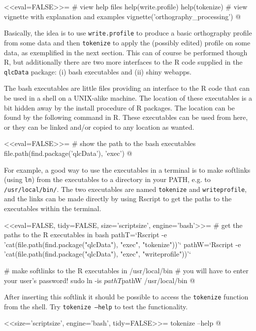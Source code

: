 <<eval=FALSE>>=
# view help files
help(write.profile)
help(tokenize)
# view vignette with explanation and examples
vignette('orthography_processing')
@

Basically, the idea is to use \texttt{write.profile} to produce a
basic orthography profile from some data and then \texttt{tokenize} to apply the
(possibly edited) profile on some data, as exemplified in the next section. This
can of course be performed though R, but additionally there are two more
interfaces to the R code supplied in the \texttt{qlcData} package: (i) bash
executables and (ii) shiny webapps.

The bash executables are little files providing an interface to the R code that
can be used in a shell on a UNIX-alike machine. The location of these
executables is a bit hidden away by the install procedure of R packages. The
location can be found by the following command in R. These executables can be 
used from here, or they can be linked and/or copied to any location as wanted.

<<eval=FALSE>>=
# show the path to the bash executables
file.path(find.package('qlcData'), 'exec')
@

For example, a good way to use the executables in a terminal is to
make softlinks (using \texttt{ln}) from the executables to a directory in your
PATH, e.g. to \texttt{/usr/local/bin/}. The two executables are named
\texttt{tokenize} and \texttt{writeprofile}, and the links can be made directly 
by using Rscript to get the paths to the executables within the terminal.

<<eval=FALSE, tidy=FALSE, size='scriptsize', engine='bash'>>=
# get the paths to the R executables in bash
pathT=`Rscript -e 'cat(file.path(find.package("qlcData"), "exec", "tokenize"))'`
pathW=`Rscript -e 'cat(file.path(find.package("qlcData"), "exec", "writeprofile"))'`

# make softlinks to the R executables in /usr/local/bin
# you will have to enter your user's password!
sudo ln -is $pathT $pathW /usr/local/bin
@

After inserting this softlink it should be possible to access the
\texttt{tokenize} function from the shell. Try \texttt{tokenize --help} to test
the functionality.

<<size='scriptsize', engine='bash', tidy=FALSE>>=
tokenize --help
@



